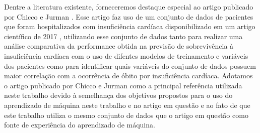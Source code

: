 Dentre a literatura existente, forneceremos destaque especial ao artigo publicado por Chicco e Jurman \cite{chicco2020}. Esse artigo faz uso de um conjunto de dados de pacientes que foram hospitalizados com insuficiência cardíaca \cite{larxel_dataset} disponibilizado em um artigo científico de 2017 \cite{dataset_article}, utilizando esse conjunto de dados tanto para realizar uma análise comparativa da performance obtida na previsão de sobrevivência à insuficiência cardíaca com o uso de difentes modelos de treinamento e variáveis dos pacientes como para identificar quais variáveis do conjunto de dados possuem maior correlação com a ocorrência de óbito por insuficiência cardíaca. Adotamos o artigo publicado por Chicco e Jurman como a principal referência utilizada neste trabalho devido à semelhança dos objetivos propostos para o uso do aprendizado de máquina neste trabalho e no artigo em questão e ao fato de que este trabalho utiliza o mesmo conjunto de dados que o artigo em questão como fonte de experiência do aprendizado de máquina.

